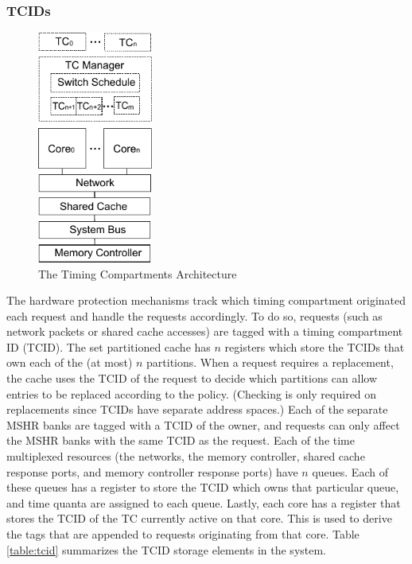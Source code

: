 \subsubsection{TCIDs}
\begin{figure}
    \begin{center}
        \includegraphics[width=1.5in]{figs/hw_sw_arch.pdf}
        \caption{The Timing Compartments Architecture}
        \label{fig:arch}
    \end{center}
\end{figure}

The hardware protection mechanisms track which timing compartment originated 
each request and handle the requests accordingly. To do so, requests (such as 
network packets or shared cache accesses) are tagged with a timing compartment 
ID (TCID). The set partitioned cache has $n$ registers which store the TCIDs
that own each of the (at most) $n$ partitions. When a request requires a 
replacement, the cache uses the TCID of the request to decide which partitions 
can allow entries to be replaced according to the policy. (Checking is only 
required on replacements since TCIDs have separate address spaces.) Each of the 
separate MSHR banks are tagged with a TCID of the owner, and requests can only 
affect the MSHR banks with the same TCID as the request. Each of the time 
multiplexed resources (the networks, the memory controller, shared cache 
response ports, and memory controller response ports) have $n$ queues. Each of 
these queues has a register to store the TCID which owns that particular queue, 
and time quanta are assigned to each queue. Lastly, each core has a register 
that stores the TCID of the TC currently active on that core. This is used to 
derive the tags that are appended to requests originating from that core. Table 
\ref{table:tcid} summarizes the TCID storage elements in the system.

